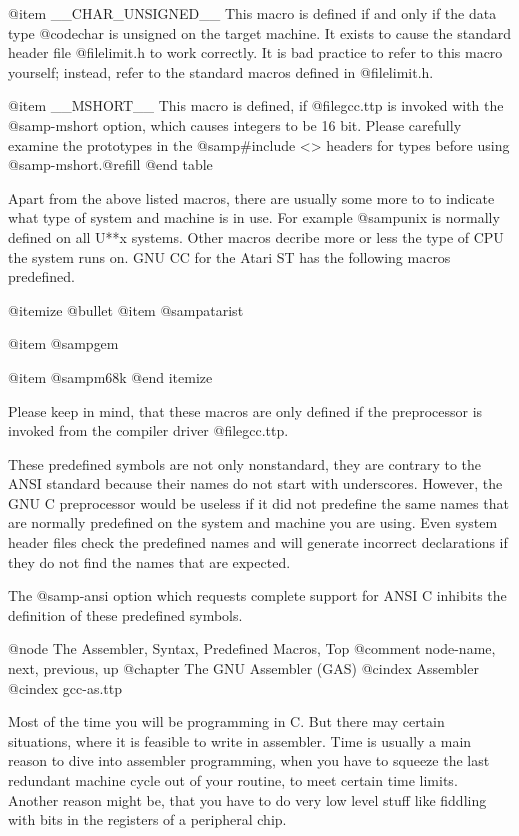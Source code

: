 {{{{@item __CHAR_UNSIGNED__
This macro is defined if and only if the data type @code{char} is
unsigned on the target machine.  It exists to cause the standard
header file @file{limit.h} to work correctly.  It is bad practice
to refer to this macro yourself; instead, refer to the standard
macros defined in @file{limit.h}.

@item __MSHORT__
This macro is defined, if @file{gcc.ttp} is invoked with the
@samp{-mshort} option, which causes integers to be 16 bit. Please
carefully examine the prototypes in the @samp{#include <>} headers
for types before using @samp{-mshort}.@refill
@end table

Apart from the above listed macros, there are usually some more to
to indicate what type of system and machine is in use. For example
@samp{unix} is normally defined on all U**x systems. Other macros
decribe more or less the type of CPU the system runs on. GNU CC for
the Atari ST has the following macros predefined.

@itemize @bullet
@item
@samp{atarist}

@item
@samp{gem}

@item
@samp{m68k}
@end itemize

Please keep in mind, that these macros are only defined if the
preprocessor is invoked from the compiler driver @file{gcc.ttp}.

These predefined symbols are not only nonstandard, they are contrary to the
ANSI standard because their names do not start with underscores.  However,
the GNU C preprocessor would be useless if it did not predefine the same
names that are normally predefined on the system and machine you are using.
Even system header files check the predefined names and will generate
incorrect declarations if they do not find the names that are expected.

The @samp{-ansi} option which requests complete support for ANSI C
inhibits the definition of these predefined symbols.

@node     The Assembler, Syntax, Predefined Macros, Top
@comment  node-name,     next,   previous,          up
@chapter The GNU Assembler (GAS)
@cindex Assembler
@cindex gcc-as.ttp

Most of the time you will be programming in C. But there may certain
situations, where it is feasible to write in assembler. Time is usually a
main reason to dive into assembler programming, when you have to squeeze
the last redundant machine cycle out of your routine, to meet certain
time limits. Another reason might be, that you have to do very low level
stuff like fiddling with bits in the registers of a peripheral chip.

}}}}
